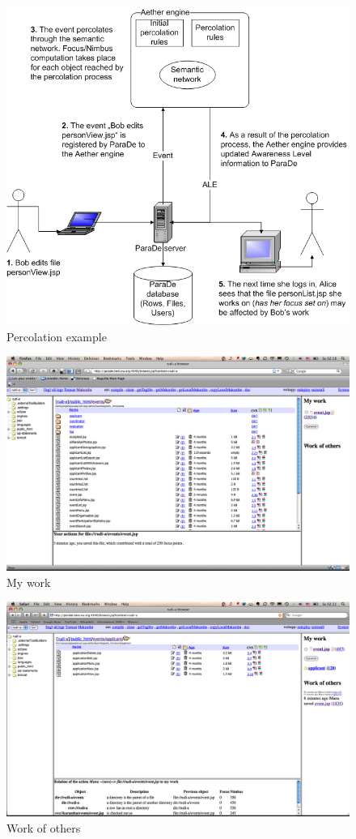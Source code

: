 \documentclass{ecscw2007}
\begin{document}
\begin{figure}[thb]
  \centering
  \includegraphics[width=.7\linewidth]{peroclation-example}
  \caption{Percolation example}
  \label{fig:percolation}
\end{figure}

\begin{figure}[thb]
  \centering
  \includegraphics[width=.9\linewidth]{my-work}
  \caption{My work}
  \label{fig:my-work}
\end{figure}

\begin{figure}[thb]
  \centering
  \includegraphics[width=.9\linewidth]{work-others}
  \caption{Work of others}
  \label{fig:work-others}
\end{figure}
\end{document}
